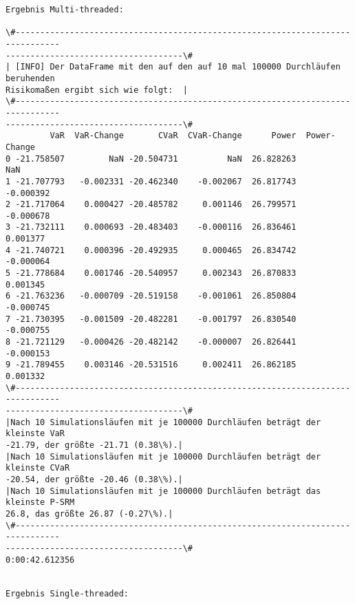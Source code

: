 \documentclass[paper=landscape]{scrartcl}
\begin{document}
    \begin{Verbatim}[commandchars=\\\{\}]
Ergebnis Multi-threaded:

\#-------------------------------------------------------------------------------
------------------------------------\#
| [INFO] Der DataFrame mit den auf den auf 10 mal 100000 Durchläufen beruhenden
Risikomaßen ergibt sich wie folgt:  |
\#-------------------------------------------------------------------------------
------------------------------------\#
         VaR  VaR-Change       CVaR  CVaR-Change      Power  Power-Change
0 -21.758507         NaN -20.504731          NaN  26.828263           NaN
1 -21.707793   -0.002331 -20.462340    -0.002067  26.817743     -0.000392
2 -21.717064    0.000427 -20.485782     0.001146  26.799571     -0.000678
3 -21.732111    0.000693 -20.483403    -0.000116  26.836461      0.001377
4 -21.740721    0.000396 -20.492935     0.000465  26.834742     -0.000064
5 -21.778684    0.001746 -20.540957     0.002343  26.870833      0.001345
6 -21.763236   -0.000709 -20.519158    -0.001061  26.850804     -0.000745
7 -21.730395   -0.001509 -20.482281    -0.001797  26.830540     -0.000755
8 -21.721129   -0.000426 -20.482142    -0.000007  26.826441     -0.000153
9 -21.789455    0.003146 -20.531516     0.002411  26.862185      0.001332
\#-------------------------------------------------------------------------------
------------------------------------\#
|Nach 10 Simulationsläufen mit je 100000 Durchläufen beträgt der kleinste VaR
-21.79, der größte -21.71 (0.38\%).|
|Nach 10 Simulationsläufen mit je 100000 Durchläufen beträgt der kleinste CVaR
-20.54, der größte -20.46 (0.38\%).|
|Nach 10 Simulationsläufen mit je 100000 Durchläufen beträgt das kleinste P-SRM
26.8, das größte 26.87 (-0.27\%).|
\#-------------------------------------------------------------------------------
------------------------------------\#
0:00:42.612356


Ergebnis Single-threaded:


\end{Verbatim}
\end{document}

